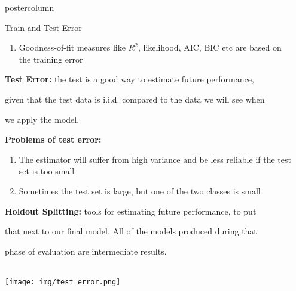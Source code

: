\documentclass{beamer}
\begin{document}
\begin{frame}[fragile]{}
\begin{columns}
\begin{column}{.31\textwidth}
\begin{beamercolorbox}[center]{postercolumn}
\begin{minipage}{.98\textwidth}
{\begin{myblock}{Train and Test Error}
\begin{enumerate}
                        \item Goodness-of-fit measures like $R^2$, likelihood, AIC, BIC etc are based on the training error
                        \end{enumerate}
                        \hspace*{1ex}
                        \begin{codebox}
							 \textbf{Test Error: }the test is a good way to estimate future performance,
						\end{codebox}
						\begin{codebox}
							 given that the test data is i.i.d. compared to the data we will see when
						\end{codebox}
							\begin{codebox}
						    we apply the model.
						\end{codebox}
						\hspace*{1ex}\textbf{Problems of test error:}
				        \begin{enumerate}
                        \item The estimator will suffer from high variance and be less reliable if the test set is too small
                        \item Sometimes the test set is large, but one of the two classes is small
                        \end{enumerate}
                        \hspace*{1ex}
						\begin{codebox}
				            \textbf{Holdout Splitting: }tools for estimating future performance, to put
						\end{codebox}
						\begin{codebox}
				            that next to our final model. All of the models produced during that
						\end{codebox}
						\begin{codebox}
				            phase of evaluation are intermediate results.
						\end{codebox}
						\hspace*{1ex}
					\\	\texttt{[image: img/test\_error.png]}
						\hspace*{1ex}		
					\end{myblock}
				}
			\end{minipage}
		\end{beamercolorbox}
	\end{column}
	\begin{column}{.31\textwidth}

\end{column}
\end{columns}
\end{frame}
\end{document}
